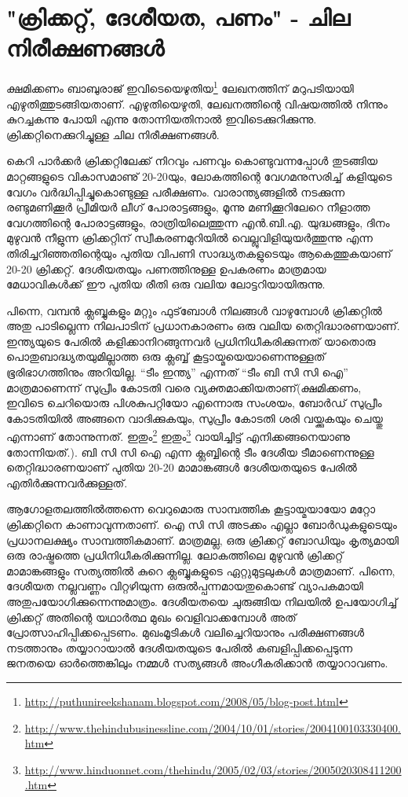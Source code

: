 \section*{"ക്രിക്കറ്റ്, ദേശീയത, പണം" - ചില നിരീക്ഷണങ്ങള്‍}
\vskip 2pt

ക്ഷമിക്കണം ബാബുരാജ് ഇവിടെയെഴുതിയ\footnote{\url{http://puthunireekshanam.blogspot.com/2008/05/blog-post.html}} ലേഖനത്തിന് മറുപടിയായി എഴുതിത്തുടങ്ങിയതാണ്. എഴുതിയെഴുതി, ലേഖനത്തിന്റെ വിഷയത്തില്‍ നിന്നും കുറച്ചകന്നു പോയി എന്നു തോന്നിയതിനാല്‍ ഇവിടെക്കുറിക്കുന്നു. ക്രിക്കറ്റിനെക്കുറിച്ചുള്ള ചില നിരീക്ഷണങ്ങള്‍.

കെറി പാര്‍ക്കര്‍ ക്രിക്കറ്റിലേക്ക് നിറവും പണവും കൊണ്ടുവന്നപ്പോള്‍ തുടങ്ങിയ മാറ്റങ്ങളുടെ വികാസമാണു് 20-20യും, ലോകത്തിന്റെ വേഗമനുസരിച്ച് കളിയുടെ വേഗം വര്‍ദ്ധിപ്പിച്ചുകൊണ്ടുള്ള പരീക്ഷണം. വാരാന്ത്യങ്ങളില്‍ നടക്കുന്ന രണ്ടുമണിക്കൂര്‍ പ്രീമിയര്‍ ലീഗ് പോരാട്ടങ്ങളും, മൂന്നു മണിക്കൂറിലേറെ നീളാത്ത വേഗത്തിന്റെ പോരാട്ടങ്ങളും, രാത്രിയിലെത്തുന്ന എന്‍.ബി.എ. യുദ്ധങ്ങളും, ദിനം മുഴുവന്‍ നീളുന്ന ക്രിക്കറ്റിന് സ്വീകരണമുറിയില്‍ വെല്ലുവിളിയുയര്‍ത്തുന്നു എന്ന തിരിച്ചറിഞ്ഞതിന്റെയും പുതിയ വിപണി സാദ്ധ്യതകളുടെയും ആകെത്തുകയാണ് 20-20 ക്രിക്കറ്റ്. ദേശീയതയും പണത്തിനുള്ള ഉപകരണം മാത്രമായ മേധാവികള്‍ക്ക് ഈ പുതിയ രീതി ഒരു വലിയ ലോട്ടറിയായിരുന്നു.

പിന്നെ, വമ്പന്‍ ക്ലബ്ബുകളും മറ്റും ഫുട്‌ബോള്‍ നിലങ്ങള്‍ വാഴുമ്പോള്‍ ക്രിക്കറ്റില്‍ അതു പാടില്ലെന്ന നിലപാടിന് പ്രധാനകാരണം ഒരു വലിയ തെറ്റിദ്ധാരണയാണ്. ഇന്ത്യയുടെ പേരില്‍ കളിക്കാനിറങ്ങുന്നവര്‍ പ്രധിനിധീകരിക്കുന്നത് യാതൊരു പൊതുബാദ്ധ്യതയുമില്ലാത്ത ഒരു ക്ലബ്ബ് കൂട്ടായ്മയെയാണെന്നുള്ളത് ഭൂരിഭാഗത്തിനും അറിയില്ല. “ടീം ഇന്ത്യ” എന്നത് “ടീം ബി സി സി ഐ” മാത്രമാണെന്ന് സുപ്രീം കോടതി വരെ വ്യക്തമാക്കിയതാണ്(ക്ഷമിക്കണം, ഇവിടെ ചെറിയൊരു പിശകുപറ്റിയോ എന്നൊരു സംശയം, ബോര്‍ഡ് സുപ്രീം കോടതിയില്‍ അങ്ങനെ വാദിക്കുകയും, സുപ്രീം കോടതി ശരി വയ്ക്കുകയും ചെയ്തു എന്നാണ് തോന്നുന്നത്. ഇതും\footnote{\url{http://www.thehindubusinessline.com/2004/10/01/stories/2004100103330400.htm}} ഇതും\footnote{\url{http://www.hinduonnet.com/thehindu/2005/02/03/stories/2005020308411200.htm}} വായിച്ചിട്ട് എനിക്കങ്ങനെയാണു തോന്നിയത്.). ബി സി സി ഐ എന്ന ക്ലബ്ബിന്റെ ടീം ദേശീയ ടീമാണെന്നുള്ള തെറ്റിദ്ധാരണയാണ് പുതിയ 20-20 മാമാങ്കങ്ങള്‍ ദേശീയതയുടെ പേരില്‍ എതിര്‍ക്കുന്നവര്‍ക്കുള്ളത്.

ആഗോളതലത്തില്‍ത്തന്നെ വെറുമൊരു സാമ്പത്തിക കൂട്ടായ്മയായോ മറ്റോ ക്രിക്കറ്റിനെ കാണാവുന്നതാണ്. ഐ സി സി അടക്കം എല്ലാ ബോര്‍ഡുകളുടെയും പ്രധാനലക്ഷ്യം സാമ്പത്തികമാണ്. മാത്രമല്ല, ഒരു ക്രിക്കറ്റ് ബോഡിയും കൃത്യമായി ഒരു രാഷ്ട്രത്തെ പ്രധിനിധീകരിക്കുന്നില്ല. ലോകത്തിലെ മുഴുവന്‍ ക്രിക്കറ്റ് മാമാങ്കങ്ങളും സത്യത്തില്‍ കുറെ ക്ലബ്ബുകളുടെ ഏറ്റുമുട്ടലുകള്‍ മാത്രമാണ്. പിന്നെ, ദേശീയത നല്ലവണ്ണം വിറ്റഴിയുന്ന ഒരുല്‍പ്പന്നമായതുകൊണ്ട് വ്യാപകമായി അതുപയോഗിക്കുന്നെന്നുമാത്രം. ദേശീയതയെ ചുരുങ്ങിയ നിലയില്‍ ഉപയോഗിച്ച് ക്രിക്കറ്റ് അതിന്റെ യഥാര്‍ത്ഥ മുഖം വെളിവാക്കമ്പോള്‍ അത് പ്രോത്സാഹിപ്പിക്കപ്പെടണം. മുഖംമൂടികള്‍ വലിച്ചെറിയാനും പരീക്ഷണങ്ങള്‍ നടത്താനും തയ്യാറായാല്‍ ദേശീയതയുടെ പേരില്‍ കബളിപ്പിക്കപ്പെടുന്ന ജനതയെ ഓര്‍ത്തെങ്കിലും നമ്മള്‍ സത്യങ്ങള്‍ അംഗീകരിക്കാന്‍ തയ്യാറാവണം.

